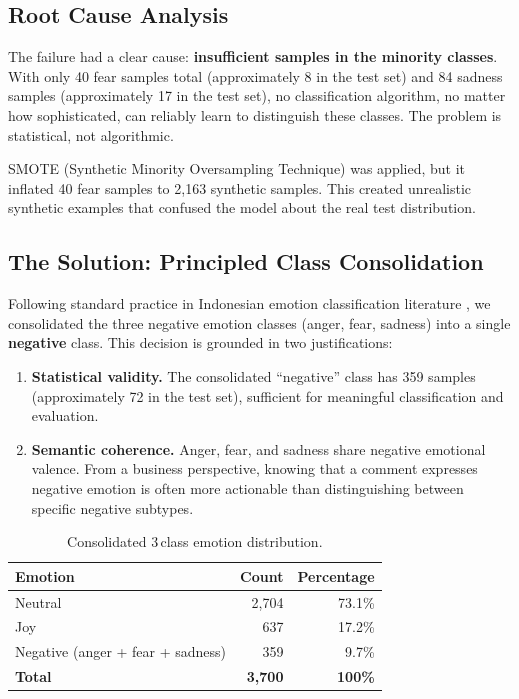 \documentclass[12pt,a4paper,twoside]{article}
\theoremstyle{definition}
\begin{document}
\subsection{Root Cause Analysis}

The failure had a clear cause: \textbf{insufficient samples in the minority classes}. With only 40 fear samples total (approximately 8 in the test set) and 84 sadness samples (approximately 17 in the test set), no classification algorithm, no matter how sophisticated, can reliably learn to distinguish these classes. The problem is statistical, not algorithmic.

SMOTE (Synthetic Minority Oversampling Technique) was applied, but it inflated 40 fear samples to 2{,}163 synthetic samples. This created unrealistic synthetic examples that confused the model about the real test distribution.

\subsection{The Solution: Principled Class Consolidation}

Following standard practice in Indonesian emotion classification literature \citep{saputri2018emotion, junianto2024ensemble}, we consolidated the three negative emotion classes (anger, fear, sadness) into a single \textbf{negative} class. This decision is grounded in two justifications:

\begin{enumerate}[leftmargin=2em]
    \item \textbf{Statistical validity.} The consolidated ``negative'' class has 359 samples (approximately 72 in the test set), sufficient for meaningful classification and evaluation.

    \item \textbf{Semantic coherence.} Anger, fear, and sadness share negative emotional valence. From a business perspective, knowing that a comment expresses negative emotion is often more actionable than distinguishing between specific negative subtypes.
\end{enumerate}

\begin{table}[h]
\centering
\caption{Consolidated 3\,class emotion distribution.}
\label{tab:dist3}
\begin{tabular}{lrr}
\toprule
\textbf{Emotion} & \textbf{Count} & \textbf{Percentage} \\
\midrule
Neutral & 2{,}704 & 73.1\% \\
Joy & 637 & 17.2\% \\
Negative (anger + fear + sadness) & 359 & 9.7\% \\
\midrule
\textbf{Total} & \textbf{3{,}700} & \textbf{100\%} \\
\bottomrule
\end{tabular}
\end{table}
\end{document}
